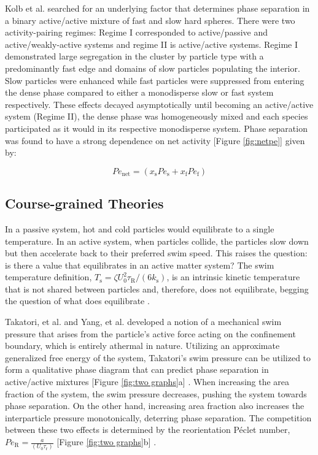 \documentclass[11pt]{article}
\begin{document}
Kolb et al. \cite{Kolb} searched for an underlying factor that determines phase separation in a binary active/active mixture of fast and slow hard spheres. There were two activity-pairing regimes:  Regime I corresponded to active/passive and active/weakly-active systems and regime II is active/active systems.  Regime I demonstrated large segregation in the cluster by particle type with a predominantly fast edge and domains of slow particles populating the interior.  Slow particles were enhanced while fast particles were suppressed from entering the dense phase compared to either a monodisperse slow or fast system respectively.  These effects decayed asymptotically until becoming an active/active system (Regime II), the dense phase was homogeneously mixed and each species participated as it would in its respective monodisperse system.  Phase separation was found to have a strong dependence on net activity [Figure \ref{fig:netpe}] given by:

\begin{equation}\label{netpe}
    Pe_\text{net}=(x_\text{s}Pe_\text{s}+x_\text{f}Pe_\text{f})
\end{equation}

\subsection{Course-grained Theories}

In a passive system, hot and cold particles would equilibrate to a single temperature.  In an active system, when particles collide, the particles slow down but then accelerate back to their preferred swim speed.  This raises the question: is there a value that equilibrates in an active matter system?  The swim temperature definition, $T_\text{s}=\zeta U_0^2 \tau_\text{R}/(6k_\text{s})$, is an intrinsic kinetic temperature that is not shared between particles and, therefore, does not equilibrate, begging the question of what does equilibrate \cite{Takatori}.

Takatori, et al. \cite{Takatori} and Yang, et al. \cite{Yang2} developed a notion of a mechanical swim pressure that arises from the particle's active force acting on the confinement boundary, which is entirely athermal in nature.  Utilizing an approximate generalized free energy of the system, Takatori's swim pressure can be utilized to form a qualitative phase diagram that can predict phase separation in active/active mixtures [Figure \ref{fig:two graphs}a] \cite{Takatori2}. When increasing the area fraction of the system, the swim pressure decreases, pushing the system towards phase separation. On the other hand, increasing area fraction also increases the interparticle pressure monotonically, deterring phase separation. The competition between these two effects is determined by the reorientation P\'{e}clet number, $Pe_\text{R}=\frac{a}{(U_\text{0}\tau_\text{r})}$ [Figure \ref{fig:two graphs}b] \cite{Takatori3}.
\end{document}
